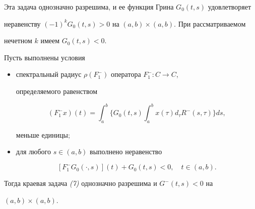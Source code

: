 Эта задача однозначно разрешима, и ее функция Грина $G_0(t,s)$ удовлетворяет 


неравенству $(-1)^kG_0(t,s)>0$ на $(a,b)\times(a,b)$. При рассматриваемом 


нечетном $k$ имеем $G_0(t,s)<0$. 


 


\begin{thm} Пусть выполнены условия 


\begin{itemize} 


\item[1)] спектральный радиус $\rho(F^-_1)$ оператора $F^-_1:C\to C$, 


определяемого равенством 


\begin{equation} 


(F^-_1x)(t)=\int^b_a\biggl\{G_0(t,s)\int^b_ax(\tau)d_\tau R^-(s,\tau) 


\biggr\}ds, 


\end{equation} 


меньше единицы; 


\item[2)] для любого $s\in(a,b)$ выполнено неравенство 


$$ 


[F^-_1G_0(\cdot,s)](t)+G_0(t,s)<0,\quad t\in(a,b). 


$$ 


\end{itemize} 


Тогда краевая задача {\em (7)} однозначно разрешима и $G^-(t,s)<0$ на 


$(a,b)\times(a,b)$. 


\end{thm} 


 


